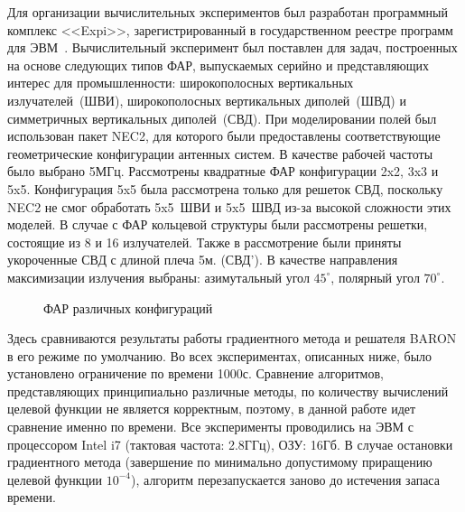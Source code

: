 Для организации вычислительных экспериментов был разработан программный комплекс <<Expi>>, зарегистрированный в государственном реестре программ для ЭВМ~\cite{expi}.
Вычислительный эксперимент был поставлен для задач, построенных на основе следующих типов ФАР, выпускаемых серийно и представляющих интерес для промышленности: широкополосных вертикальных излучателей~(ШВИ), широкополосных вертикальных диполей~(ШВД) и симметричных вертикальных диполей~(СВД). При моделировании полей был использован пакет NEC2, для которого были предоставлены соответствующие геометрические конфигурации антенных систем. В качестве рабочей частоты было выбрано 5МГц. Рассмотрены квадратные ФАР конфигурации 2x2, 3x3 и 5x5. Конфигурация 5x5 была рассмотрена только для решеток СВД, поскольку NEC2 не смог обработать 5x5~ШВИ и 5x5~ШВД из-за высокой сложности этих моделей. В случае с ФАР кольцевой структуры были рассмотрены решетки, состоящие из 8 и 16 излучателей. Также в рассмотрение были приняты укороченные СВД с длиной плеча 5м. (СВД'). В качестве направления максимизации излучения выбраны: азимутальный угол $45^{\circ}$, полярный угол $70^{\circ}$.

\begin{figure}
    \begin{minipage}[h]{0.49\linewidth}
    \end{minipage}
    \hfill
    \begin{minipage}[h]{0.49\linewidth}
    \end{minipage}
    \begin{minipage}[h]{0.49\linewidth}
    \end{minipage}
    \hfill
    \begin{minipage}[h]{0.49\linewidth}
    \end{minipage}
    \caption{ФАР различных конфигураций}
    \label{ris:paas_0}
\end{figure}

Здесь сравниваются результаты работы градиентного метода и решателя BARON в его режиме по умолчанию. Во всех экспериментах, описанных ниже, было установлено ограничение по времени 1000с. Сравнение алгоритмов, представляющих принципиально различные методы, по количеству вычислений целевой функции не является корректным, поэтому, в данной работе идет сравнение именно по времени. Все эксперименты проводились на ЭВМ с процессором Intel i7 (тактовая частота: 2.8ГГц), ОЗУ: 16Гб. В случае остановки градиентного метода (завершение по минимально допустимому приращению целевой функции $10^{-4}$), алгоритм перезапускается заново до истечения запаса времени.


